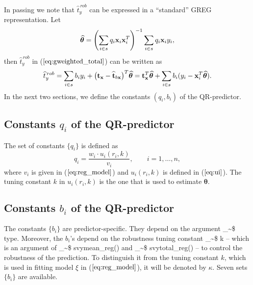 \documentclass[a4paper,oneside,11pt,DIV=12]{scrartcl}
\makeatletter
\theoremstyle{remark}
\newcommand\code{\bgroup\@makeother\_\@makeother\~\@makeother\$\@makeother\^\@codex}
\def\@codex#1{{\normalfont\ttfamily\hyphenchar\font=-1 #1}\egroup}
\makeatother
\begin{document}
\noindent In passing we note that $\widehat{t}_y^{\,rob}$ can be expressed in a
``standard'' GREG representation. Let
\begin{equation*}
    \widehat{\boldsymbol \theta} = \left(\sum_{i \in s}q_i \bold x_i \bold
    x_i^T\right)^{-1} \sum_{i \in s} q_i\bold x_iy_i,
\end{equation*}
\noindent then $\widehat{t}_y^{\,rob}$ in ($\ref{eq:gweighted_total}$) can be
written as
\begin{equation*}
    \widehat{t}_{y}^{\,rob} = \sum_{i \in s} b_i y_i + \big(\bold t_{\bold x} -
    \widehat{\bold t}_{b\bold x}\big)^T \widehat{\boldsymbol \theta} = \bold
    t_{\bold x}^T\widehat{\boldsymbol \theta} + \sum_{i \in s}b_i (y_i - \bold
    x_i^T\widehat{\boldsymbol \theta}).
\end{equation*}
\noindent In the next two sections, we define the constants $(q_i, b_i)$ of the
QR-predictor.

\subsection{Constants $q_i$ of the QR-predictor}
The set of constants $\{q_i\}$ is defined as
\begin{equation}\label{eq:qi}
    q_i =\frac{w_i \cdot u_i(r_i,k)}{v_i}, \qquad i = 1,\ldots,n,
\end{equation}
\noindent where $v_i$ is given in ($\ref{eq:reg_model}$) and $u_i(r_i,k)$ is
defined in ($\ref{eq:ui}$). The tuning constant $k$ in $u_i(r_i,k)$ is the one
that is used to estimate $\boldsymbol \theta$.

\subsection{Constants $b_i$ of the QR-predictor}
The constants $\{b_i\}$ are predictor-specific. They depend on the argument
\code{type}. Moreover, the $b_i$'s depend on the robustness tuning constant
\code{k} -- which is an argument of \code{svymean_reg()} and
\code{svytotal_reg()} -- to control the robustness of the prediction. To
distinguish it from the tuning constant $k$, which is used in fitting model
$\xi$ in ($\ref{eq:reg_model}$), it will be denoted by $\kappa$. Seven sets
$\{b_i\}$ are available.
\end{document}
